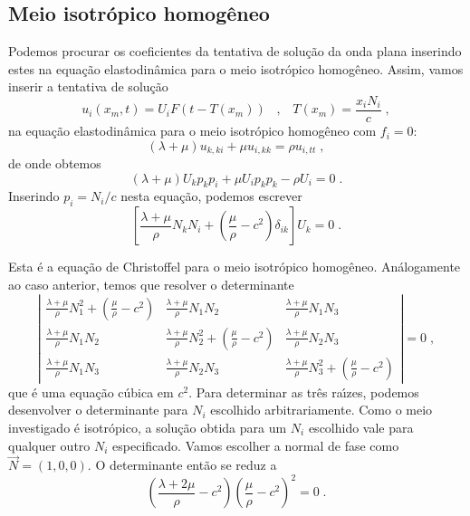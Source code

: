 \subsection{Meio isotr\'opico homog\^eneo}

Podemos procurar os coeficientes da tentativa de solu\c{c}\~ao da
onda plana inserindo estes na equa\c{c}\~ao elastodin\^amica para
o meio isotr\'opico homog\^eneo. Assim, vamos inserir a tentativa
de solu\c{c}\~ao
\begin{equation}
u_i(x_m,t)=U_iF(t-T(x_m)) \;\;\;,\;\;\; T(x_m)=\frac{x_i N_i}{c}
\;,
\end{equation}
na equa\c{c}\~ao elastodin\^amica para o meio isotr\'opico
homog\^eneo com $f_i=0$:
\begin{equation}
(\lambda+\mu)u_{k,ki}+\mu u_{i,kk} = \rho u_{i,tt} \;,
\end{equation}
de onde obtemos
\begin{equation}
(\lambda+\mu)U_kp_kp_i+\mu U_ip_kp_k-\rho U_i=0 \;.
\end{equation}
Inserindo $p_i=N_i/c$ nesta equa\c{c}\~ao, podemos escrever
\begin{equation}
\left[\frac{\lambda+\mu}{\rho}N_kN_i+\left(\frac{\mu}{\rho}-c^2
\right)\delta_{ik} \right] U_k=0 \;.
\end{equation}

Esta \'e a equa\c{c}\~ao de Christoffel para o meio isotr\'opico
homog\^eneo. An\'alogamente ao caso anterior, temos que resolver o
determinante
\begin{equation} \left |
\begin{array}{ccc}
\frac{\lambda+\mu}{\rho}N_1^2+\left(\frac{\mu}{\rho}-c^2 \right) &
\frac{\lambda+\mu}{\rho}N_1N_2 &
\frac{\lambda+\mu}{\rho}N_1N_3\\
\frac{\lambda+\mu}{\rho}N_1N_2 &
\frac{\lambda+\mu}{\rho}N_2^2+\left(\frac{\mu}{\rho}-c^2 \right) &
\frac{\lambda+\mu}{\rho}N_2N_3\\
\frac{\lambda+\mu}{\rho}N_1N_3 & \frac{\lambda+\mu}{\rho}N_2N_3  &
\frac{\lambda+\mu}{\rho}N_3^2+\left(\frac{\mu}{\rho}-c^2 \right)
\end{array} \right| =0 \;,
\label{M}
\end{equation}
que \'e uma equa\c{c}\~ao c\'ubica em $c^2$. Para determinar as
tr\^es ra\'{\i}zes, podemos desenvolver o determinante para $N_i$
escolhido arbitrariamente. Como o meio investigado \'e
isotr\'opico, a solu\c{c}\~ao obtida para um $N_i$ escolhido vale
para qualquer outro $N_i$ especificado. Vamos escolher a normal de
fase como $\vec{N}=(1,0,0)$. O determinante ent\~ao se reduz a
\begin{equation}
\left(\frac{\lambda+2\mu}{\rho}-c^2 \right)
\left(\frac{\mu}{\rho}-c^2 \right)^2 = 0 \;.
\end{equation}

